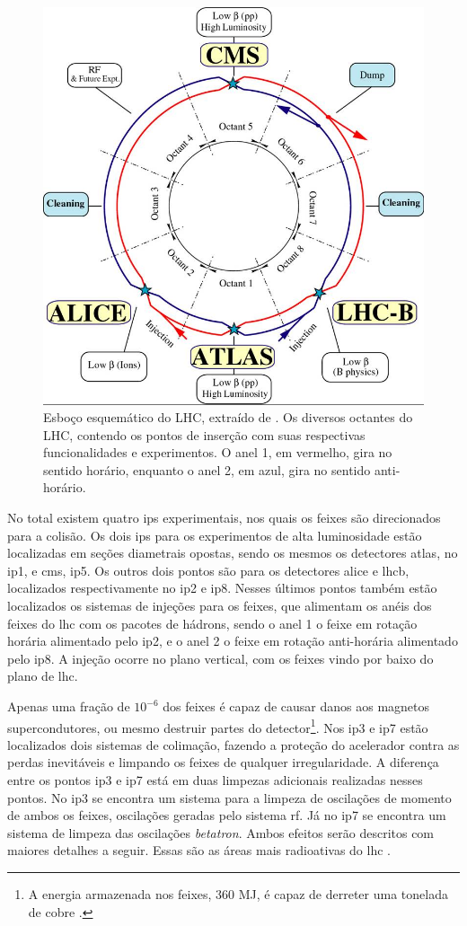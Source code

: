 \begin{figure}[h!t]
\centering
\includegraphics[width=.6\textwidth]{imagens/lhc-schematic.png}
\caption[Esboço esquemático do LHC]{Esboço esquemático do LHC, extraído de
\cite{webLHC}. Os diversos octantes do LHC, contendo os pontos de inserção 
com suas respectivas funcionalidades e experimentos.
O anel 1, em vermelho, gira no sentido horário, enquanto o anel
2, em azul, gira no sentido anti-horário.}
\label{fig:esquema_lhc}
\end{figure}

No total existem quatro \glspl{ip} experimentais, nos quais os feixes são
direcionados para a colisão. Os dois \glspl{ip} para
os experimentos de alta luminosidade estão localizadas em seções diametrais
opostas, sendo os mesmos os detectores \acrshort{atlas}, no \gls{ip}1, e
\acrshort{cms}, \gls{ip}5. 
Os outros dois pontos são para os detectores \acrshort{alice} e
\acrshort{lhcb}, localizados respectivamente no \gls{ip}2 e \gls{ip}8. Nesses últimos
pontos também estão localizados os sistemas de injeções para os feixes, que
alimentam os anéis dos feixes do \gls{lhc} 
com os pacotes de hádrons, sendo o anel 1 o feixe em rotação horária alimentado
pelo \gls{ip}2, e o anel 2 o 
feixe em rotação anti-horária alimentado pelo \gls{ip}8. 
A injeção ocorre no plano vertical, com os feixes
vindo por baixo do plano de \gls{lhc}. 

Apenas uma fração de $10^{-6}$ dos feixes é capaz de causar
danos aos magnetos supercondutores, ou mesmo destruir partes do detector\footnote{A 
energia armazenada nos feixes, 360 MJ, é capaz de derreter uma tonelada 
de cobre \cite{closerLook,lhc_design}.}. Nos \gls{ip}3 e \gls{ip}7 estão localizados 
dois sistemas de colimação, fazendo a proteção 
do acelerador contra as perdas inevitáveis e limpando os feixes de
qualquer irregularidade. A diferença entre os pontos \gls{ip}3 e \gls{ip}7 está
em duas limpezas adicionais realizadas nesses pontos. No \gls{ip}3 se
encontra um sistema para a limpeza de oscilações de momento de ambos os feixes,
oscilações geradas pelo sistema \acrshort{rf}. Já no \gls{ip}7 se encontra um sistema de
limpeza das oscilações \emph{betatron}. Ambos efeitos serão descritos com
maiores detalhes a seguir. Essas são as áreas mais radioativas do \gls{lhc} 
\cite{lhc_design}.


